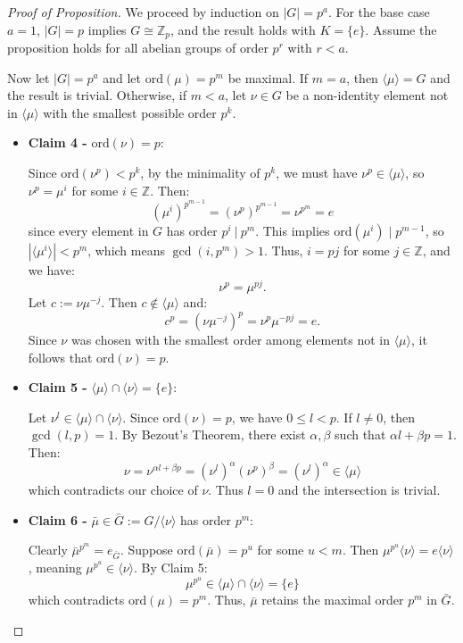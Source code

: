 \begin{proof}[Proof of Proposition]
We proceed by induction on $|G| = p^a$. For the base case $a=1$, $|G| = p$ implies $G \cong \mathbb{Z}_p$, and the result holds with $K = \{e\}$. Assume the proposition holds for all abelian groups of order $p^r$ with $r < a$. 

Now let $|G| = p^a$ and let $\text{ord}(\mu) = p^m$ be maximal.
If $m=a$, then $\langle \mu \rangle = G$ and the result is trivial. Otherwise, if $m < a$, let $\nu \in G$ be a non-identity element not in $\langle \mu \rangle$ with the smallest possible order $p^k$.

\begin{itemize}
    \item \textbf{Claim 4 -} $\text{ord}(\nu) = p$: 
    
    Since $\text{ord}(\nu^p) < p^k$, by the minimality of $p^k$, we must have $\nu^p \in \langle \mu \rangle$, so $\nu^p = \mu^i$ for some $i \in \mathbb{Z}$. Then:
    \[ (\mu^i)^{p^{m-1}} = (\nu^p)^{p^{m-1}} = \nu^{p^m} = e \]
    since every element in $G$ has order $p^i \ |\ p^m$. This implies $\text{ord}(\mu^i) \mid p^{m-1}$, so $|\langle \mu^i \rangle| < p^m$, which means $\gcd(i, p^m) > 1$. Thus, $i = pj$ for some $j \in \mathbb{Z}$, and we have:
    \[ \nu^p = \mu^{pj}. \] 
    Let $c := \nu \mu^{-j}$. Then $c \notin \langle \mu \rangle$ and:
    \[ c^p = (\nu \mu^{-j})^p = \nu^p \mu^{-pj} = e. \]
    Since $\nu$ was chosen with the smallest order among elements not in $\langle \mu \rangle$, it follows that $\text{ord}(\nu) = p$.

    \item \textbf{Claim 5 -} $\langle \mu \rangle \cap \langle \nu \rangle = \{e\}$: 
    
    Let $\nu^l \in \langle \mu \rangle \cap \langle \nu \rangle$. Since $\text{ord}(\nu) = p$, we have $0 \le l < p$. If $l \neq 0$, then $\gcd(l, p) = 1$. By Bezout's Theorem, there exist $\alpha, \beta$ such that $\alpha l + \beta p = 1$. Then:
    \[ \nu = \nu^{\alpha l + \beta p} = (\nu^l)^\alpha (\nu^p)^\beta = (\nu^l)^\alpha \in \langle \mu \rangle \]
    which contradicts our choice of $\nu$. Thus $l=0$ and the intersection is trivial.

    \item \textbf{Claim 6 -} $\bar{\mu} \in \bar{G} := G/\langle \nu \rangle$ has order $p^m$: 
    
    Clearly $\bar{\mu}^{p^m} = e_{\bar{G}}$. Suppose $\text{ord}(\bar{\mu}) = p^u$ for some $u < m$. Then $\mu^{p^u} \langle \nu \rangle = e\langle \nu \rangle$, meaning $\mu^{p^u} \in \langle \nu \rangle$. By Claim 5:
    \[ \mu^{p^u} \in \langle \mu \rangle \cap \langle \nu \rangle = \{e\} \]
    which contradicts $\text{ord}(\mu) = p^m$. Thus, $\bar{\mu}$ retains the maximal order $p^m$ in $\bar{G}$.


\end{itemize}
\end{proof}
